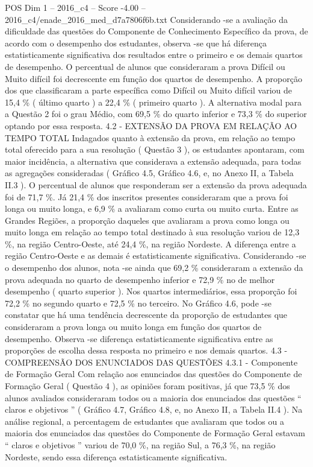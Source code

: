 \begin{textsample}{POS Dim 1 – 2016\_c4 – Score -4.00 – 2016\_c4/enade\_2016\_med\_d7a7806f6b.txt}
Considerando -se a avaliação da dificuldade das questões do Componente de Conhecimento Específico da prova, de acordo com o desempenho dos estudantes, observa -se que há diferença estatisticamente significativa dos resultados entre o primeiro e os demais quartos de desempenho.
O percentual de alunos que consideraram a prova Difícil ou Muito difícil foi decrescente em função dos quartos de desempenho.
A proporção dos que classificaram a parte específica como Difícil ou Muito difícil variou de 15,4 \% ( último quarto ) a 22,4 \% ( primeiro quarto ).
A alternativa modal para a Questão 2 foi o grau Médio, com 69,5 \% do quarto inferior e 73,3 \% do superior optando por essa resposta. 4.2 - EXTENSÃO DA PROVA EM RELAÇÃO AO TEMPO TOTAL Indagados quanto à extensão da prova, em relação ao tempo total oferecido para a sua resolução ( Questão 3 ), os estudantes apontaram, com maior incidência, a alternativa que considerava a extensão adequada, para todas as agregações consideradas ( Gráfico 4.5, Gráfico 4.6, e, no Anexo II, a Tabela II.3 ).
O percentual de alunos que responderam ser a extensão da prova adequada foi de 71,7 \%.
Já 21,4 \% dos inscritos presentes consideraram que a prova foi longa ou muito longa, e 6,9 \% a avaliaram como curta ou muito curta.
Entre as Grandes Regiões, a proporção daqueles que avaliaram a prova como longa ou muito longa em relação ao tempo total destinado à sua resolução variou de 12,3 \%, na região Centro-Oeste, até 24,4 \%, na região Nordeste.
A diferença entre a região Centro-Oeste e as demais é estatisticamente significativa.
Considerando -se o desempenho dos alunos, nota -se ainda que 69,2 \% consideraram a extensão da prova adequada no quarto de desempenho inferior e 72,9 \% no de melhor desempenho ( quarto superior ).
Nos quartos intermediários, essa proporção foi 72,2 \% no segundo quarto e 72,5 \% no terceiro.
No Gráfico 4.6, pode -se constatar que há uma tendência decrescente da proporção de estudantes que consideraram a prova longa ou muito longa em função dos quartos de desempenho.
Observa -se diferença estatisticamente significativa entre as proporções de escolha dessa resposta no primeiro e nos demais quartos. 4.3 - COMPREENSÃO DOS ENUNCIADOS DAS QUESTÕES 4.3.1 - Componente de Formação Geral Com relação aos enunciados das questões do Componente de Formação Geral ( Questão 4 ), as opiniões foram positivas, já que 73,5 \% dos alunos avaliados consideraram todos ou a maioria dos enunciados das questões “ claros e objetivos ” ( Gráfico 4.7, Gráfico 4.8, e, no Anexo II, a Tabela II.4 ).
Na análise regional, a percentagem de estudantes que avaliaram que todos ou a maioria dos enunciados das questões do Componente de Formação Geral estavam “ claros e objetivos ” variou de 70,0 \%, na região Sul, a 76,3 \%, na região Nordeste, sendo essa diferença estatisticamente significativa.

\end{textsample}
